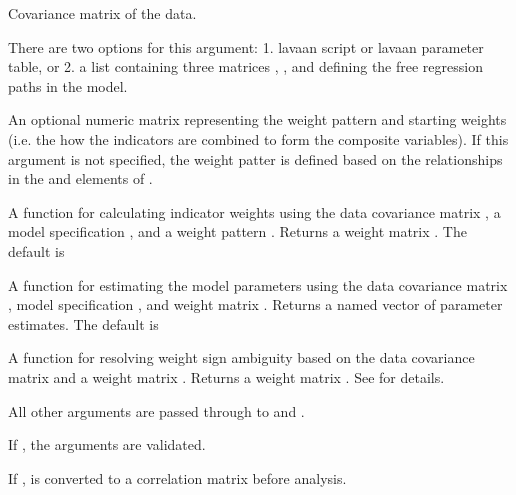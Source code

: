 \documentclass[a4paper]{book}
\begin{document}
\begin{Arguments}
\begin{ldescription}
\item[\code{S}] Covariance matrix of the data.

\item[\code{model}] There are two options for this argument: 1. lavaan script or lavaan parameter
table, or 2. a list containing three matrices
, , and  defining the free regression paths
in the model.

\item[\code{W.model}] An optional numeric matrix representing the weight pattern and starting weights
(i.e. the how the indicators are combined to form the composite variables). If this argument is not specified,
the weight patter is defined based on the relationships in the  and  
elements of .

\item[\code{weightFun}] A function for calculating indicator weights using the data covariance matrix
, a model specification , and a weight pattern . Returns
a weight matrix . The default is 

\item[\code{parameterEstim}] A function for estimating the model parameters using
the data covariance matrix , model specification , 
and weight matrix . Returns a named vector of parameter estimates.
The default is 

\item[\code{weightSign}] A function for resolving weight sign ambiguity based on the data covariance matrix
 and a weight matrix .  Returns
a weight matrix . See 
for details.

\item[\code{...}] All other arguments are passed through to  and .

\item[\code{validateInput}] If , the arguments are validated.

\item[\code{standardize}] If ,  is converted to a correlation matrix before analysis.
\end{ldescription}
\end{Arguments}
\end{document}
